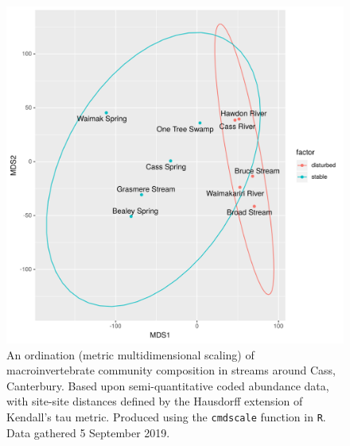 \documentclass[a4paper,10pt]{article}
\newcommand\datadate{5 September 2019} %
\begin{document}
\begin{figure}[p]
	\centering
	\includegraphics[width=\textwidth]{site-ordination}
	\caption[Site ordination]{ %
		An ordination (metric multidimensional scaling) of macroinvertebrate community composition in streams around Cass, Canterbury.
		Based upon semi-quantitative coded abundance data, with site-site distances defined by the Hausdorff extension of Kendall's tau metric.
		Produced using the \texttt{cmdscale} function in \texttt{R}.
		Data gathered {\datadate}.
	}\label{fig:site-ordination}
\end{figure}


\FloatBarrier
\printbibliography
\end{document}
